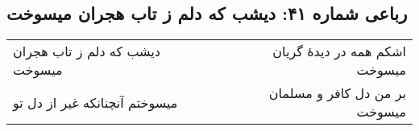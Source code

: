 \begin{center}
\section*{رباعی شماره ۴۱: دیشب که دلم ز تاب هجران میسوخت}
\label{sec:sh041}
\begin{longtable}{l p{0.5cm} r}
دیشب که دلم ز تاب هجران میسوخت
&&
اشکم همه در دیدهٔ گریان میسوخت
\\
میسوختم آنچنانکه غیر از دل تو
&&
بر من دل کافر و مسلمان میسوخت
\\
\end{longtable}
\end{center}

